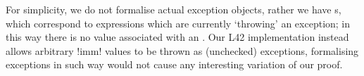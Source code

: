 For simplicity, we do not formalise actual exception objects, rather we have \error{}s, which correspond to expressions which are currently  `throwing' an exception; 
in this way there is no value associated with an \error.
Our L42 implementation instead allows arbitrary \Q!imm! values to be thrown as (unchecked) exceptions, formalising exceptions in such way would not cause any interesting variation of our proof.

\begin{figure}
	\begin{grammatica}
		\\
		\\
		\\
		\\
		\\
		
		\\
		\\
		

\end{grammatica}
\end{figure}
